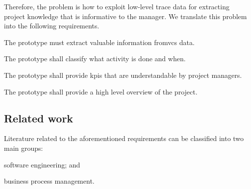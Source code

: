 Therefore, the problem is how to exploit low-level trace data for extracting project knowledge that is informative to the manager. We translate this problem into the following requirements.

\noindent
\begin{inparadesc}
\item[RQ1. (Processing of \gls{vcs} event logs).] The prototype must extract valuable information from\gls{vcs} data. \\
\item[RQ2. (Identification of the activities).] The prototype shall classify what activity is done and when.\\
\item[RQ3. (Computation of KPIs).] The prototype shall provide \glspl{kpi} that are understandable by project managers.\\
\item[RQ4. (Visualization of project status).] The prototype shall provide a high level overview of the project.
\end{inparadesc}



\subsection{Related work}
\label{subsec:requirements}

Literature related to the aforementioned requirements can be classified into two main groups: \begin{inparaenum}[\itshape (i)]
\item software engineering; and 
\item business process management.
\end{inparaenum} 

% 

